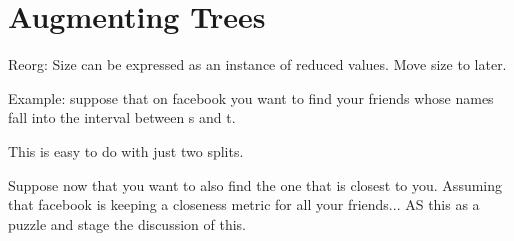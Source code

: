 \begin{comment}
There are two problems with expectations, at least on their own.
Firstly, they tell us very little if anything about the variance.  And
secondly, as mentioned in an earlier lecture, the expectation of a
maximum can be much higher than the maximum of expectations.  The
first has implications in real time systems where we need to get
things done in time, and the second in getting efficient parallel
algorithms (e.g., span is the max span of the two parallel
calls).  Proving these high probability bounds is beyond the scope of
this course.
\end{comment}


\begin{comment}
\section*{Summary}

Earlier we showed that randomized quicksort has worst-case expected
$O(n \lg n)$ work, and this expectation was independent of the input.
That is, there is no bad input that would cause the work to be worse
than $O(n \lg n)$ all the time.  It is possible, however, (with extremely low
probability) we could be unlucky, and the random chosen pivots could
result in quicksort taking $O(n^2)$ work.

It turns out the same analysis shows that a deterministic quicksort will
on average have $O(n \lg n)$ work.  Just shuffle the input randomly,
and run the algorithm.  It behaves the same way as randomized
quicksort on that shuffled input.  Unfortunately, on some inputs
(e.g., almost sorted) the deterministic quicksort is slow, $O(n^2)$,
every time on that input.

Treaps take advantage of the same randomization idea.  But a binary
search tree is a dynamic data structure, and it cannot change the order in
which operations are applied to it. So instead of randomizing the input
order, it adds randomization to the data structure itself.
\end{comment}



\section{Augmenting Trees}

\begin{notesonly}
Reorg: Size can be expressed as an instance of reduced values.  Move
size to later.

Example: suppose that on facebook you want to find your friends
whose names fall into the interval between s and t.

This is easy to do with just two splits.  

Suppose now that you want to also find the one that is closest to
you.  Assuming that facebook is keeping a closeness metric for all
your friends... AS this as a puzzle and stage the discussion of this.




\end{notesonly}

